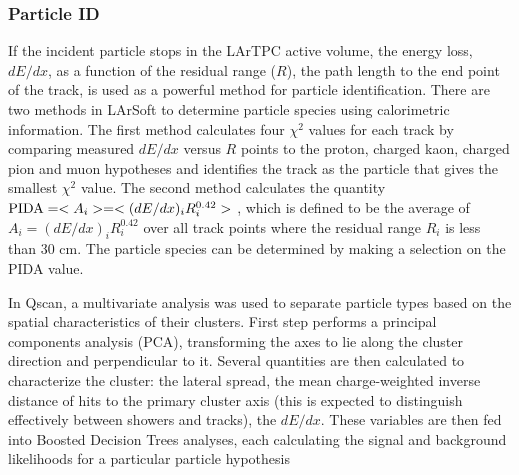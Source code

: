 %



\subsubsection{Particle ID}


If the incident particle stops in the LArTPC active volume, the energy
loss, $dE/dx$, as a function of the residual range ($R$), the path
length to the end point of the track, is used as a powerful method for
particle identification. There are two methods in LArSoft to determine
particle species using calorimetric information. The first method
calculates four $\chi^{2}$ values for each track by comparing measured
$dE/dx$ versus $R$ points to the proton, charged kaon, charged pion
and muon hypotheses and identifies the track as the particle that
gives the smallest $\chi^{2}$ value. The second method calculates the
quantity ${\rm{PIDA}} = <A_{i}> = <(dE/dx)_{i}R_{i}^{0.42}>$ \cite{box},
which is defined to be the average of $A_{i} =
(dE/dx)_{i}R_{i}^{0.42}$ over all track points where the residual
range $R_{i}$ is less than 30 cm. The particle species can be
determined by making a selection on the PIDA value.


In Qscan, a multivariate analysis was used to separate particle types based on the spatial characteristics of their clusters.
First step performs a principal components analysis (PCA), transforming the axes to lie along the 
cluster direction and perpendicular to it. Several quantities are then calculated to 
characterize the cluster: the lateral spread, the mean charge-weighted inverse distance of hits to the primary cluster axis
(this is expected to distinguish effectively between showers and tracks), the $dE/dx$.
These variables are then fed into Boosted Decision Trees analyses, 
each calculating the signal and background likelihoods for a particular particle hypothesis

